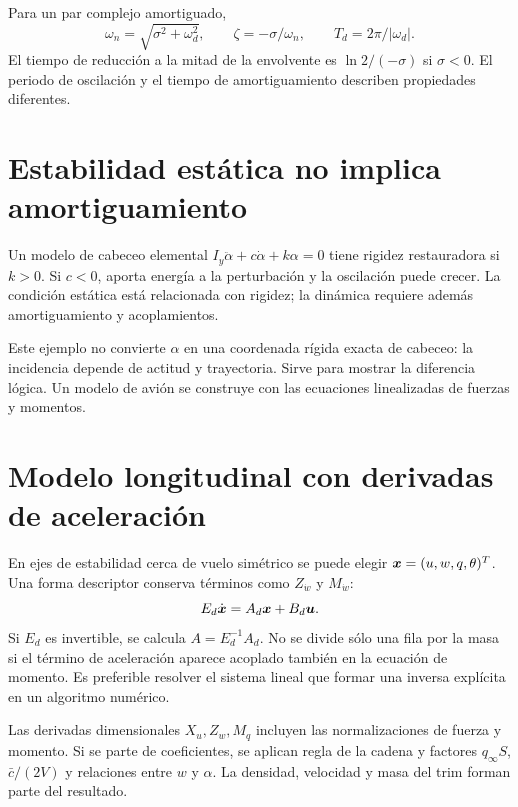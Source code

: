 Para un par complejo amortiguado,
\begin{equation}
\omega_n=\sqrt{\sigma^2+\omega_d^2},\qquad
\zeta=-\sigma/\omega_n,\qquad T_d=2\pi/|\omega_d|.
\end{equation}
El tiempo de reducción a la mitad de la envolvente es $\ln2/(-\sigma)$ si $\sigma<0$. El periodo de oscilación y el tiempo de amortiguamiento describen propiedades diferentes.


\section{Estabilidad estática no implica amortiguamiento}
Un modelo de cabeceo elemental $I_y\ddot\alpha+c\dot\alpha+k\alpha=0$ tiene rigidez restauradora si $k>0$. Si $c<0$, aporta energía a la perturbación y la oscilación puede crecer. La condición estática está relacionada con rigidez; la dinámica requiere además amortiguamiento y acoplamientos.

Este ejemplo no convierte $\alpha$ en una coordenada rígida exacta de cabeceo: la incidencia depende de actitud y trayectoria. Sirve para mostrar la diferencia lógica. Un modelo de avión se construye con las ecuaciones linealizadas de fuerzas y momentos.

\section{Modelo longitudinal con derivadas de aceleración}
En ejes de estabilidad cerca de vuelo simétrico se puede elegir $\boldsymbol{x}=(u,w,q,\theta)^T$. Una forma descriptor conserva términos como $Z_{\dot w}$ y $M_{\dot w}$:
\begin{equation}
E_d\dot{\boldsymbol{x}}=A_d\boldsymbol{x}+B_d\boldsymbol{u}.
\end{equation}
Si $E_d$ es invertible, se calcula $A=E_d^{-1}A_d$. No se divide sólo una fila por la masa si el término de aceleración aparece acoplado también en la ecuación de momento. Es preferible resolver el sistema lineal que formar una inversa explícita en un algoritmo numérico.

Las derivadas dimensionales $X_u,Z_w,M_q$ incluyen las normalizaciones de fuerza y momento. Si se parte de coeficientes, se aplican regla de la cadena y factores $q_\infty S$, $\bar c/(2V)$ y relaciones entre $w$ y $\alpha$. La densidad, velocidad y masa del trim forman parte del resultado.

